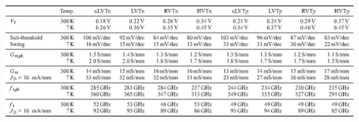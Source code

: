 \documentclass[journal]{IEEEtran}
\newcommand{\CR}[1]{{\color{black}#1}}
\begin{document}
\begin{table}[bt!]\begin{center}
\caption{Extracted transistor parameters}\label{transistors}
\includegraphics[width=1.91\columnwidth]{Figures/table_3}


\end{center}
\end{table}
\end{document}
